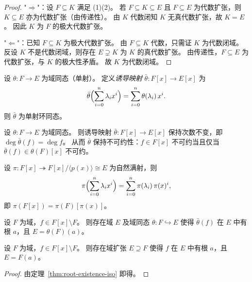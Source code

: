 \documentclass[lang=cn,a4paper,newtx]{elegantbook}
\begin{document}
\begin{proof}
  "$\Rightarrow$"：设 $F\subseteq K$ 满足 (1)(2)。
  若 $F\subseteq K\subseteq E$ 且 $F\subseteq E$ 为代数扩张，则 $K\subseteq E$ 亦为代数扩张（由传递性）。
  由 $K$ 代数闭知 $K$ 无真代数扩张，故 $K=E$。
  因此 $K$ 为 $F$ 的极大代数扩张。

  "$\Leftarrow$"：已知 $F\subseteq K$ 为极大代数扩张。
  由 $F\subseteq K$ 代数，只需证 $K$ 为代数闭域。
  反设 $K$ 不是代数闭域，则存在 $E\supsetneq K$ 为 $K$ 的真代数扩张。
  由传递性，$F\subseteq E$ 为代数扩张，与 $K$ 的极大性矛盾。
  故 $K$ 为代数闭域。
\end{proof}

\begin{definition}[域同态的诱导多项式映射]
  设 $\theta\colon F\to E$ 为域同态（单射）。
  定义\emph{诱导映射} $\bar\theta\colon F[x]\to E[x]$ 为
  \[
    \bar\theta\Bigl(\sum_{i=0}^{n}\lambda_i x^i\Bigr)=\sum_{i=0}^{n}\theta(\lambda_i)\,x^i.
  \]
  则 $\bar\theta$ 为单射环同态。
\end{definition}

\begin{remark}
  设 $\theta\colon F\to E$ 为域同态。
  则诱导映射 $\bar\theta\colon F[x]\to E[x]$ 保持次数不变，即 $\deg\bar\theta(f)=\deg f$。
  从而 $\bar\theta$ 保持不可约性：$f\in F[x]$ 不可约当且仅当 $\bar\theta(f)\in\theta(F)[x]$ 不可约。
\end{remark}

\begin{remark}
  设 $\pi\colon F[x]\twoheadrightarrow F[x]/\langle p(x)\rangle\cong E$ 为自然满射，则
  \[
    \pi\Bigl(\sum_{i=0}^{n}\lambda_i x^i\Bigr)=\sum_{i=0}^{n}\pi(\lambda_i)\,\pi(x)^i,
  \]
  即 $\pi(F[x])=\pi(F)[\pi(x)]$。
\end{remark}

\begin{theorem}\label{root-existence-iso}
  设 $F$ 为域，$f\in F[x]\setminus F$。
  则存在域 $E$ 及域同态 $\theta\colon F\hookrightarrow E$ 使得 $\bar\theta(f)$ 在 $E$ 中有根 $a$，且 $E=\theta(F)(a)$。
\end{theorem}

\begin{theorem}
  设 $F$ 为域，$f\in F[x]\setminus F$。
  则存在域扩张 $E\supseteq F$ 使得 $f$ 在 $E$ 中有根 $a$，且 $E=F(a)$。
\end{theorem}

\begin{proof}
  由定理~\ref{thm:root-existence-iso} 即得。
\end{proof}
\end{document}
